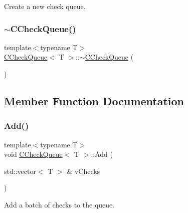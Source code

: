 Create a new check queue. 

\mbox{\label{class_c_check_queue_a05820838bd337f6e882ad21ac590d524}} 
\subsubsection{\texorpdfstring{$\sim$\+C\+Check\+Queue()}{~CCheckQueue()}}
{\footnotesize\ttfamily template$<$typename T$>$ \\
\mbox{\hyperlink{class_c_check_queue}{C\+Check\+Queue}}$<$ T $>$\+::$\sim$\mbox{\hyperlink{class_c_check_queue}{C\+Check\+Queue}} (\begin{DoxyParamCaption}{ }\end{DoxyParamCaption})\hspace{0.3cm}{\ttfamily [inline]}}



\subsection{Member Function Documentation}
\mbox{\label{class_c_check_queue_aee8e83bcdeef17740937e6c1dc84c478}} 
\subsubsection{\texorpdfstring{Add()}{Add()}}
{\footnotesize\ttfamily template$<$typename T$>$ \\
void \mbox{\hyperlink{class_c_check_queue}{C\+Check\+Queue}}$<$ T $>$\+::Add (\begin{DoxyParamCaption}\item[{std\+::vector$<$ T $>$ \&}]{v\+Checks }\end{DoxyParamCaption})\hspace{0.3cm}{\ttfamily [inline]}}



Add a batch of checks to the queue. 

\mbox{\label{class_c_check_queue_a3c091928859b0936331341edeb977325}} 
